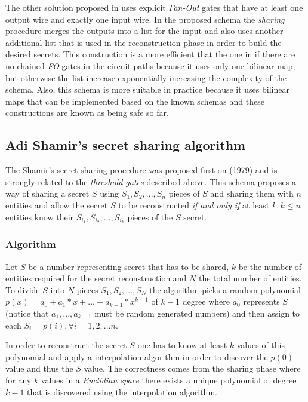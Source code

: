 \documentclass[12pt]{article}
\begin{document}
The other solution proposed in \cite{fltccd} uses explicit \textit{Fan-Out} gates that have at least one output wire and exactly one input wire. In the proposed schema the \textit{sharing} procedure merges the outputs into a list for the input and also uses another additional list that is used in the reconstruction phase in order to build the desired secrets. This construction is a more efficient that the one in \cite{gghsw} if there are no chained \textit{FO} gates in the circuit paths because it uses only one bilinear map, but otherwise the list increase exponentially increasing the complexity of the schema. Also, this schema is more suitable in practice because it uses bilinear maps that can be implemented based on the known schemas and these constructions are known as being safe so far.

\subsection{Adi Shamir's secret sharing algorithm}

The Shamir's secret sharing procedure was proposed first on \cite{shamir}(1979) and is strongly related to the \textit{threshold gates} described above. This schema proposes a way of sharing a secret $S$ using $S_1, S_2, ..., S_n$ pieces of $S$ and sharing them with $n$ entities and allow the secret $S$ to be reconstructed \textit{if and only if} at least $k, k \le n$ entities know their $S_{i_1}, S_{i_2}, ..., S_{i_k}$ pieces of the $S$ secret. 

\subsubsection{Algorithm}

Let $S$ be a number representing secret that has to be shared, $k$ be the number of entities required for the secret reconstruction and $N$ the total number of entities. To divide $S$ into $N$ pieces $S_1, S_2, ..., S_N$ the algorithm picks a random polynomial $p(x) = a_0 + a_1 * x + ... + a_{k - 1} * x^{k - 1}$ of $k - 1$ degree where $a_0$ represents $S$ (notice that $a_1, ..., a_{k - 1}$ must be random generated numbers) and then assign to each $S_i = p(i), \forall i = {1, 2, ... n}$.

In order to reconstruct the secret $S$ one has to know at least $k$ values of this polynomial and apply a interpolation algorithm in order to discover the $p(0)$ value and thus the $S$ value. The correctness comes from the sharing phase where for any $k$ values in a \textit{Euclidian space} there exists a unique polynomial of degree $k - 1$ that is discovered using the interpolation algorithm.
\end{document}
